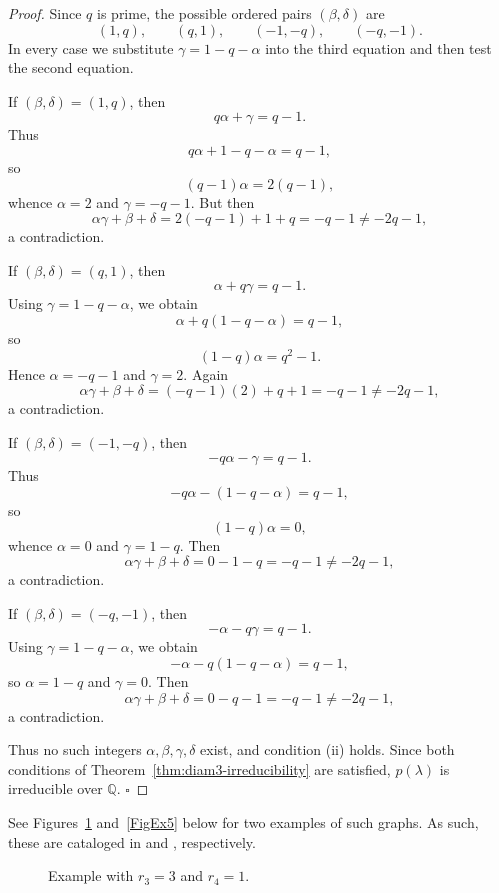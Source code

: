 \documentclass[11pt]{amsart}
\begin{document}
\begin{proof}
Since \(q\) is prime, the possible ordered pairs \((\beta,\delta)\) are
\[
(1,q),\qquad(q,1),\qquad(-1,-q),\qquad(-q,-1).
\]
In every case we substitute \(\gamma=1-q-\alpha\) into the third equation and then test the second equation.

If \((\beta,\delta)=(1,q)\), then
\[
q\alpha+\gamma=q-1.
\]
Thus
\[
q\alpha+1-q-\alpha=q-1,
\]
so
\[
(q-1)\alpha=2(q-1),
\]
whence \(\alpha=2\) and \(\gamma=-q-1\). But then
\[
\alpha\gamma+\beta+\delta
=
2(-q-1)+1+q
=
-q-1
\neq
-2q-1,
\]
a contradiction.

If \((\beta,\delta)=(q,1)\), then
\[
\alpha+q\gamma=q-1.
\]
Using \(\gamma=1-q-\alpha\), we obtain
\[
\alpha+q(1-q-\alpha)=q-1,
\]
so
\[
(1-q)\alpha=q^2-1.
\]
Hence \(\alpha=-q-1\) and \(\gamma=2\). Again
\[
\alpha\gamma+\beta+\delta
=
(-q-1)(2)+q+1
=
-q-1
\neq
-2q-1,
\]
a contradiction.

If \((\beta,\delta)=(-1,-q)\), then
\[
-q\alpha-\gamma=q-1.
\]
Thus
\[
-q\alpha-(1-q-\alpha)=q-1,
\]
so
\[
(1-q)\alpha=0,
\]
whence \(\alpha=0\) and \(\gamma=1-q\). Then
\[
\alpha\gamma+\beta+\delta
=
0-1-q
=
-q-1
\neq
-2q-1,
\]
a contradiction.

If \((\beta,\delta)=(-q,-1)\), then
\[
-\alpha-q\gamma=q-1.
\]
Using \(\gamma=1-q-\alpha\), we obtain
\[
-\alpha-q(1-q-\alpha)=q-1,
\]
so \(\alpha=1-q\) and \(\gamma=0\). Then
\[
\alpha\gamma+\beta+\delta
=
0-q-1
=
-q-1
\neq
-2q-1,
\]
a contradiction.

Thus no such integers \(\alpha,\beta,\gamma,\delta\) exist, and condition \textup{(ii)} holds. Since both conditions of Theorem~\ref{thm:diam3-irreducibility} are satisfied, \(p(\lambda)\) is irreducible over \(\mathbb Q\). \hfill $\square$
\end{proof}

See Figures~\ref{FigEx3} and~\ref{FigEx5} below for two examples of such graphs. As such, these are cataloged in \cite[p.~629]{Lewis2002} and \cite[p.~14]{Lewis2026}, respectively.

\begin{figure}[htb]
\centering
{}
\caption{Example with \(r_3=3\) and \(r_4=1\).}
\label{FigEx3}
\end{figure}
\end{document}
